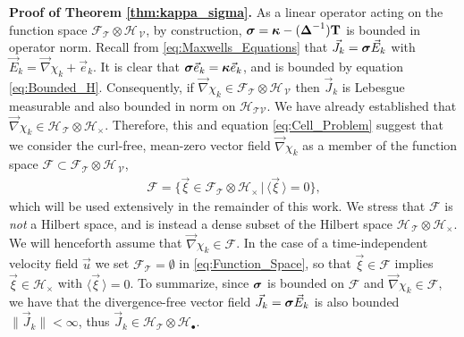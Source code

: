\documentclass[11pt]{amsart}
\newcommand{\Tb}{\mathbf{T}}
\newcommand{\Tc}{\mathcal{T}}
\newcommand{\Vc}{\mathcal{V}}
\newcommand{\Hs}{\mathscr{H}}
\newcommand{\Fs}{\mathscr{F}}
\newcommand\bsig{\mbox{\boldmath${\sigma}$}}
\newcommand\bDelta{\mbox{\boldmath${\Delta}$}}
\newcommand\bkappa{\mbox{\boldmath${\kappa}$}}
\begin{document}
\textbf{Proof of Theorem \ref{thm:kappa_sigma}.}\hspace{1ex}
%
As a linear operator acting on the function space
$\Fs_{\Tc}\otimes\Hs_{\,\Vc}$, by construction,
$\bsig=\bkappa-(\bDelta^{-1})\Tb$ is bounded in operator norm. Recall
from \eqref{eq:Maxwells_Equations} that $\vec{J}_k=\bsig\vec{E}_k$
with $\vec{E}_k=\vec{\nabla}\chi_k+\vec{e}_k$. It is clear that
$\bsig\vec{e}_k=\bkappa\vec{e}_k$, and is bounded by equation
\eqref{eq:Bounded_H}. Consequently, if
$\vec{\nabla}\chi_k\in\Fs_{\Tc}\otimes\Hs_{\,\Vc}$ then  
$\vec{J}_k$ is Lebesgue measurable and also bounded in norm on 
$\Hs_{\Tc\Vc}$. We have already established that 
$\vec{\nabla}\chi_k\in\Hs_{\,\Tc}\otimes\Hs_\times$. Therefore, this and equation
\eqref{eq:Cell_Problem} suggest that we consider the curl-free,
mean-zero vector field $\vec{\nabla}\chi_k$ as a member of the function space
$\Fs\subset\Fs_{\Tc}\otimes\Hs_{\,\Vc}$,         
%
\begin{align}\label{eq:Function_Space}
  \Fs=\{\vec{\xi}\in\Fs_{\Tc}\otimes\Hs_\times \,|\, \langle\vec{\xi}\,\rangle=0\},  
\end{align}
%
which will be used extensively in the remainder of this work. We
stress that $\Fs$ is \emph{not} a Hilbert space, and is instead a
dense subset of the Hilbert space $\Hs_{\,\Tc}\otimes\Hs_\times$. We will
henceforth assume that $\vec{\nabla}\chi_k\in\Fs$. In the case of a
time-independent velocity field $\vec{u}$ we set $\Fs_{\Tc}=\emptyset$ in 
\eqref{eq:Function_Space}, so that $\vec{\xi}\in\Fs$ implies 
$\vec{\xi}\in\Hs_\times$ with $\langle\vec{\xi}\,\rangle=0$. To summarize, since $\bsig$ is
bounded on $\Fs$ and $\vec{\nabla}\chi_k\in\Fs$, we have that the
divergence-free vector field $\vec{J}_k=\bsig\vec{E}_k$ is also
bounded $\|\vec{J}_k\|<\infty$, thus $\vec{J}_k\in\Hs_{\Tc}\otimes\Hs_\bullet$.  
\end{document}
